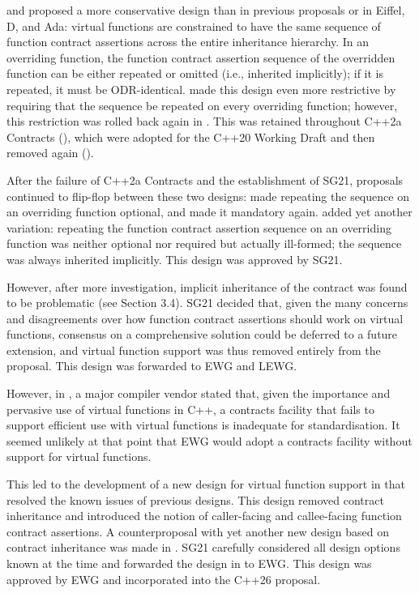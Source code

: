 \cite{N4415} and \cite{P0287R0} proposed a more conservative design than in previous proposals or in Eiffel, D, and Ada: virtual functions are constrained to have the same sequence of function contract assertions across the entire inheritance hierarchy. In an overriding function, the function contract assertion sequence of the overridden function can be either repeated or omitted (i.e., inherited implicitly); if it is repeated, it must be ODR-identical. \cite{P0380R0} made this design even more restrictive by requiring that the sequence be repeated on every overriding function; however, this restriction was rolled back again in \cite{P0380R1}. This was retained throughout C++2a Contracts (\cite{P0542R5}), which were adopted for the C++20 Working Draft and then removed again (\cite{P1823R0}).

After the failure of C++2a Contracts and the establishment of SG21, proposals continued to flip-flop between these two designs: \cite{P2388R4} made repeating the sequence on an overriding function optional, and \cite{P2521R5} made it mandatory again. \cite{P2954R0} added yet another variation: repeating the function contract assertion sequence on an overriding function was neither optional nor required but actually ill-formed; the sequence was always inherited implicitly. This design was approved by SG21.

However, after more investigation, implicit inheritance of the contract was found to be problematic (see \cite{P2932R3} Section 3.4). SG21 decided that, given the many concerns and disagreements over how function contract assertions should work on virtual functions, consensus on a comprehensive
solution could be deferred to a future extension, and virtual function support was thus removed
entirely from the proposal. This design was forwarded to EWG and LEWG.

However, in \cite{P3173R0}, a major compiler vendor stated that, given the importance and pervasive use of virtual functions in C++, a contracts facility that fails to support efficient use with virtual functions is inadequate for standardisation. It seemed unlikely at that point that EWG would adopt a contracts facility without support for virtual functions.

This led to the development of a new design for virtual function support in \cite{P3097R0} that resolved the known issues of previous designs. This design removed contract inheritance and introduced the notion of caller-facing and callee-facing function contract assertions. A counterproposal with yet another new design based on contract inheritance was made in \cite{P3169R0}. SG21 carefully considered all design options known at the time and forwarded the design in \cite{P3097R0} to EWG. This design was approved by EWG and incorporated into the C++26 proposal.

